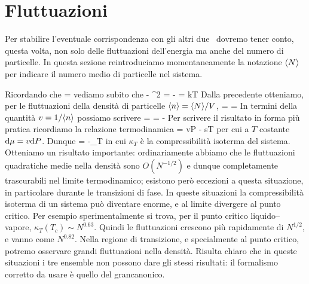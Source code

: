
\section{Fluttuazioni}

Per stabilire l'eventuale corrispondenza con gli altri due \ensembles\ dovremo tener conto, questa volta, non solo delle fluttuazioni dell'energia ma anche del numero di particelle. In questa sezione reintroduciamo momentaneamente la notazione $\langle N\rangle$ per indicare il numero medio di particelle nel sistema.

Ricordando che
\be
{} = 
\ee
vediamo subito che
\be
{} \equiv {} - ^2 = - = kT
\ee
Dalla precedente otteniamo, per le fluttuazioni della densità di particelle $\langle n\rangle = \langle N\rangle/V$,
\be
{} =  = 
\ee
In termini della quantità $v = 1/\langle n\rangle$ possiamo scrivere
\be
{} =  = -
\ee
Per scrivere il risultato in forma più pratica ricordiamo la relazione termodinamica
\be
\de\mu = v\de P - s\de T
\ee
per cui a $T$ costante ${\textrm d}\mu = v{\textrm d}P$. Dunque
\be
\label{eq:fluttNGran}
 = - \equiv {}\kappa_T
\ee
in cui $\kappa_T$ è la compressibilità isoterma del sistema. Otteniamo un risultato importante: ordinariamente abbiamo che le fluttuazioni quadratiche medie nella densità sono $O(N^{-1/2})$ e dunque completamente trascurabili nel limite termodinamico; esistono però eccezioni a questa situazione, in particolare durante le transizioni di fase. In queste situazioni la compressibilità isoterma di un sistema può diventare enorme, e al limite divergere al punto critico. Per esempio sperimentalmente si trova, per il punto critico liquido--vapore, $\kappa_T(T_c) \sim N^{0.63}$. Quindi le fluttuazioni crescono più rapidamente di $N^{1/2}$, e vanno come $N^{0.82}$. Nella regione di transizione, e specialmente al punto critico, potremo osservare grandi fluttuazioni nella densità. Risulta chiaro che in queste situazioni i tre ensemble non possono dare gli stessi risultati: il formalismo corretto da usare è quello del grancanonico.

